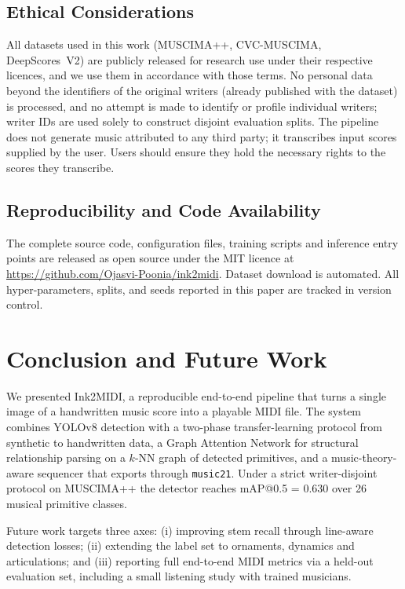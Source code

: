\documentclass[conference]{IEEEtran}
\begin{document}
\subsection{Ethical Considerations}
All datasets used in this work (MUSCIMA++, CVC-MUSCIMA, DeepScores~V2) are
publicly released for research use under their respective licences, and we
use them in accordance with those terms. No personal data beyond the
identifiers of the original writers (already published with the dataset)
is processed, and no attempt is made to identify or profile individual
writers; writer IDs are used solely to construct disjoint evaluation
splits. The pipeline does not generate music attributed to any third
party; it transcribes input scores supplied by the user. Users should
ensure they hold the necessary rights to the scores they transcribe.

\subsection{Reproducibility and Code Availability}\label{sec:availability}
The complete source code, configuration files, training scripts and
inference entry points are released as open source under the MIT licence at
\url{https://github.com/Ojasvi-Poonia/ink2midi}. Dataset download is
automated. All hyper-parameters, splits, and seeds reported in this paper
are tracked in version control.

\section{Conclusion and Future Work}\label{sec:conclusion}
We presented Ink2MIDI, a reproducible end-to-end pipeline that turns a
single image of a handwritten music score into a playable MIDI file. The
system combines YOLOv8 detection with a two-phase transfer-learning
protocol from synthetic to handwritten data, a Graph Attention Network for
structural relationship parsing on a $k$-NN graph of detected primitives,
and a music-theory-aware sequencer that exports through \texttt{music21}.
Under a strict writer-disjoint protocol on MUSCIMA++ the detector reaches
mAP@0.5 = 0.630 over 26 musical primitive classes.

Future work targets three axes: (i) improving stem recall through
line-aware detection losses; (ii) extending the label set to ornaments,
dynamics and articulations; and (iii) reporting full end-to-end MIDI
metrics via a held-out evaluation set, including a small listening study
with trained musicians.
\end{document}

